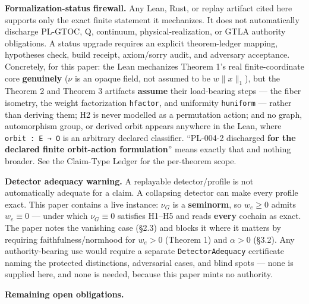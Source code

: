 \documentclass[
  11pt,
]{article}
\begin{document}
\textbf{Formalization-status firewall.} Any Lean, Rust, or replay
artifact cited here supports only the exact finite statement it
mechanizes. It does not automatically discharge PL-GTOC, Q, continuum,
physical-realization, or GTLA authority obligations. A status upgrade
requires an explicit theorem-ledger mapping, hypotheses check, build
receipt, axiom/sorry audit, and adversary acceptance. Concretely, for
this paper: the Lean mechanizes Theorem 1's real finite-coordinate core
\textbf{genuinely} (\(\nu\) is an opaque field, not assumed to be
\(w\lVert x\rVert_1\)), but the Theorem 2 and Theorem 3 artifacts
\textbf{assume} their load-bearing steps --- the fiber isometry, the
weight factorization \texttt{hfactor}, and uniformity \texttt{huniform}
--- rather than deriving them; H2 is never modelled as a permutation
action; and no graph, automorphism group, or derived orbit appears
anywhere in the Lean, where \texttt{orbit : E → O} is an arbitrary
declared classifier. ``PL-004-2 discharged \textbf{for the declared
finite orbit-action formulation}'' means exactly that and nothing
broader. See the Claim-Type Ledger for the per-theorem scope.

\textbf{Detector adequacy warning.} A replayable detector/profile is not
automatically adequate for a claim. A collapsing detector can make every
profile exact. This paper contains a live instance: \(\nu_G\) is a
\textbf{seminorm}, so \(w_e\ge0\) admits \(w_e\equiv0\) --- under which
\(\nu_G\equiv0\) satisfies H1--H5 and reads \textbf{every} cochain as
exact. The paper notes the vanishing case (§2.3) and blocks it where it
matters by requiring faithfulness/normhood for \(w_e>0\) (Theorem 1) and
\(\alpha>0\) (§3.2). Any authority-bearing use would require a separate
\texttt{DetectorAdequacy} certificate naming the protected distinctions,
adversarial cases, and blind spots --- none is supplied here, and none
is needed, because this paper mints no authority.

\textbf{Remaining open obligations.}
\end{document}
